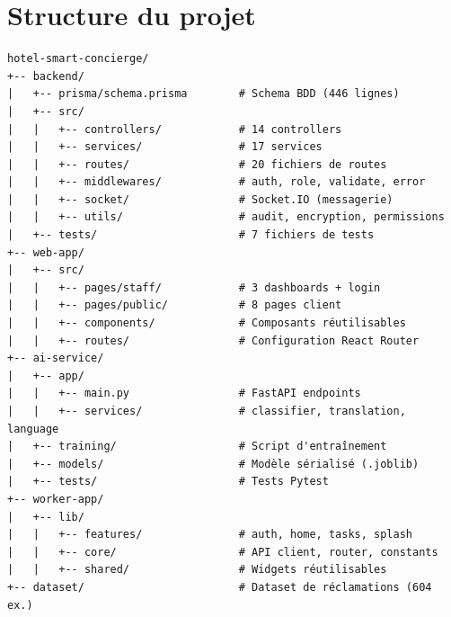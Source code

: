 \section{Structure du projet}
\label{sec:structure_projet}
\begin{lstlisting}[caption={Arborescence simplifiée du projet LoomStay}]
hotel-smart-concierge/
+-- backend/
|   +-- prisma/schema.prisma        # Schema BDD (446 lignes)
|   +-- src/
|   |   +-- controllers/            # 14 controllers
|   |   +-- services/               # 17 services
|   |   +-- routes/                 # 20 fichiers de routes
|   |   +-- middlewares/            # auth, role, validate, error
|   |   +-- socket/                 # Socket.IO (messagerie)
|   |   +-- utils/                  # audit, encryption, permissions
|   +-- tests/                      # 7 fichiers de tests
+-- web-app/
|   +-- src/
|   |   +-- pages/staff/            # 3 dashboards + login
|   |   +-- pages/public/           # 8 pages client
|   |   +-- components/             # Composants réutilisables
|   |   +-- routes/                 # Configuration React Router
+-- ai-service/
|   +-- app/
|   |   +-- main.py                 # FastAPI endpoints
|   |   +-- services/               # classifier, translation, language
|   +-- training/                   # Script d'entraînement
|   +-- models/                     # Modèle sérialisé (.joblib)
|   +-- tests/                      # Tests Pytest
+-- worker-app/
|   +-- lib/
|   |   +-- features/               # auth, home, tasks, splash
|   |   +-- core/                   # API client, router, constants
|   |   +-- shared/                 # Widgets réutilisables
+-- dataset/                        # Dataset de réclamations (604 ex.)
\end{lstlisting}

